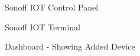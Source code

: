 \documentclass[oneside,a4paper,12pt]{book}
\begin{document}
\begin{center}
    \begin{figure}[!htbp]
        \centering
        \caption{Sonoff IOT Control Panel}
    \end{figure}
\end{center}

\begin{center}
    \begin{figure}[!htbp]
        \centering
        \caption{Sonoff IOT Terminal}
    \end{figure}
\end{center}

\begin{center}
    \begin{figure}[!htbp]
        \centering
        \caption{Dashboard - Showing Added Device}
    \end{figure}
\end{center}
\end{document}
